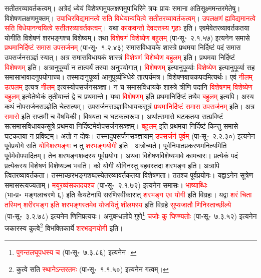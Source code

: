 \begin{sloppypar}
{सतीतर\-व्यावर्तकत्वम्}। अत्रेदं ध्येयं विशेषणमुप\-लक्षणमुपाधिरिमे त्रयः प्रायः समाना अतिसूक्ष्ममन्तरमेतेषु। विशेषण\-लक्षणमुक्तम्। \textcolor{red}{उपाधिरविद्यमानत्वे सति विधेयान्वयित्वे सतीतर\-व्यावर्तकत्वम्}। \textcolor{red}{उपलक्षणं ह्यविद्यमानत्वे सति विधेयानन्वयित्वे सतीतर\-व्यावर्तकत्वम्}। यथा \textcolor{red}{काकवन्तो देवदत्तस्य गृहाः} इति। एवमेवेतर\-व्यावर्तकतया योगीति विशेषणं शरभङ्गश्च विशेष्यम्। तथा \textcolor{red}{विशेषणं विशेष्येण बहुलम्‌} (पा॰सू॰~२.१.५७) इत्यनेन समासे \textcolor{red}{प्रथमा\-निर्दिष्टं समास उपसर्जनम्‌} (पा॰सू॰~१.२.४३) समास\-विधायके शास्त्रे प्रथमया निर्दिष्टं पदं समास उपसर्जन\-सञ्ज्ञं स्यात्। अत्र समास\-विधायकं शास्त्रं \textcolor{red}{विशेषणं विशेष्येण बहुलम्‌} इति। प्रथमया निर्दिष्टं \textcolor{red}{विशेषणम्‌} इति। अत्रानुपूर्व्यां न तात्पर्यं तस्या अनुपयोगात्। \textcolor{red}{विशेषणम्‌} इत्यानुपूर्व्याः \textcolor{red}{विशेष्येण} इत्यानुपूर्व्या सह समासाभावादनुप\-योगाच्च। तस्मादानुपूर्व्या आनुपूर्व्यभिधेये तात्पर्यमत्र। विशेषण\-वाचक\-पदमित्यर्थः। एवं \textcolor{red}{नीलम् उत्पलम्‌} इत्यत्र \textcolor{red}{नीलम्‌} इत्यस्योपसर्जन\-सञ्ज्ञा। न च समास\-विधायके शास्त्रे त्रीणि पदानि \textcolor{red}{विशेषणम् विशेष्येण बहुलम्‌} इत्येतेष्वेकं तृतीयान्तं द्वे च प्रथमान्ते। यथा \textcolor{red}{विशेषणम्‌} इति प्रथमा\-निर्दिष्टं तथैव \textcolor{red}{बहुलम्‌} इत्यपि। अस्य कथं नोपसर्जन\-सञ्ज्ञेति चेत्सत्यम्। उपसर्जन\-सञ्ज्ञा\-विधायक\-सूत्रं \textcolor{red}{प्रथमा\-निर्दिष्टं समास उपसर्जनम्‌} इति। अत्र \textcolor{red}{समासे} इति सप्तमी च वैषयिकी। विषयता च घटकत्व\-रूपा। अर्थात्समासे घटकतया सत्प्रविष्टं सत्समास\-विधायक\-सूत्रे प्रथमया निर्दिष्टमेवोपसर्जन\-सञ्ज्ञम्। \textcolor{red}{बहुलम्‌} इति प्रथमया निर्दिष्टं किन्तु समासे घटकतया न प्रविष्टम्। अतो न दोषः। तस्मादुपसर्जन\-सञ्ज्ञायाम् \textcolor{red}{उपसर्जनं पूर्वम्‌} (पा॰सू॰~२.२.३०) इत्यनेन पूर्व\-प्रयोगे सति \textcolor{red}{योगि\-शरभङ्गः} न तु \textcolor{red}{शरभङ्ग\-योगी} इति। अत्रोच्यते। पूर्व\-निपात\-प्रकरणमनित्यमिति पूर्वमेवोप\-पादितम्। तेन शरभङ्ग\-शब्दस्य पूर्व\-प्रयोगः। अथवा विशेषण\-विशेष्य\-भावे काम\-चारः। प्रत्येकं पदं प्रत्येकस्य विशेषणं विशेष्यञ्च भवति। को योगी योगिनस्तु बहवस्तदा शरभङ्ग इति। अत्रापि त्वितर\-व्यावर्तकता। तस्माच्छरभङ्ग\-शब्दस्येतर\-व्यावर्तकतया विशेषणता। ततश्च पूर्व\-प्रयोगः। यद्वाऽनेन सूत्रेण समासस्त्यज्यताम्। \textcolor{red}{मयूर\-व्यंसकादयश्च} (पा॰सू॰~२.१.७२) इत्यनेन समासः। \textcolor{red}{भाष्याब्धिः} (भा॰प्र॰~मङ्गलाचरणे ६) इति कैयटेनापि सरणि\-स्वीकारात् \textcolor{red}{शरभङ्ग एव योगी} इति विग्रहः। यद्वा \textcolor{red}{शरं चिता तस्मिन् शरीरभङ्ग इति शरभङ्गस्तमेव योजयितुं शीलमस्य} इति विग्रहे \textcolor{red}{सुप्यजातौ णिनिस्ताच्छील्ये} (पा॰सू॰~३.२.७८) इत्यनेन णिनि\-प्रत्ययः। अनुबन्ध\-लोपे गुणे\footnote{\textcolor{red}{पुगन्त\-लघूपधस्य च} (पा॰सू॰~७.३.८६) इत्यनेन।} \textcolor{red}{चजोः कु घिण्ण्यतोः} (पा॰सू॰~७.३.५२) इत्यनेन जकारस्य कुत्वे\footnote{कुत्वे सति \textcolor{red}{स्थानेऽन्तरतमः} (पा॰सू॰~१.१.५०) इत्यनेन गत्वम्।} विभक्ति\-कार्ये \textcolor{red}{शरभङ्ग\-योगी} इति।\end{sloppypar}

